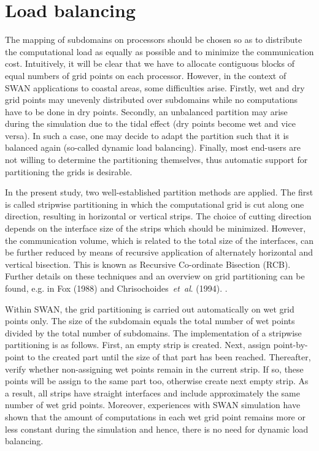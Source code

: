 \documentclass[12pt]{book}
\begin{document}
\section{Load balancing} \label{sec:loa}

The mapping of subdomains on processors should be chosen so as to distribute
the computational load as equally as possible and to minimize the communication
cost. Intuitively, it will be clear that we have to allocate contiguous blocks
of equal numbers of grid points on each processor. However, in the context of
SWAN applications to coastal areas, some difficulties arise. Firstly, wet and
dry grid points may unevenly distributed over subdomains while no computations
have to be done in dry points. Secondly, an unbalanced partition may arise
during the simulation due to the tidal effect (dry points become wet and vice
versa). In such a case, one may decide to adapt the partition such that it is
balanced again (so-called dynamic load balancing). Finally, most end-users are
not willing to determine the partitioning themselves, thus automatic support
for partitioning the grids is desirable.

In the present study, two well-established partition methods are applied. The
first is called stripwise partitioning in which the computational grid is cut
along one direction, resulting in horizontal or vertical strips. The choice of
cutting direction depends on the interface size of the strips which should be
minimized. However, the communication volume, which is related to the total size
of the interfaces, can be further reduced by means of recursive application of
alternately horizontal and vertical bisection. This is known as Recursive
Co-ordinate Bisection (RCB). Further details on these techniques and an overview
on grid partitioning can be found, e.g. in Fox (1988) and Chrisochoides~{\it et~al}. (1994).
\nocite{Fox88,Chr94HR}.

Within SWAN, the grid partitioning is carried out automatically on wet grid points
only. The size of the subdomain equals the total number of wet points divided by
the total number of subdomains. The implementation of a stripwise partitioning is
as follows. First, an empty strip is created. Next, assign point-by-point to the
created part until the size of that part has been reached. Thereafter, verify
whether non-assigning wet points remain in the current strip. If so, these points
will be assign to the same part too, otherwise create next empty strip. As a result,
all strips have straight interfaces and include approximately the same number of wet
grid points. Moreover, experiences with SWAN simulation have shown that the amount
of computations in each wet grid point remains more or less constant during the
simulation and hence, there is no need for dynamic load balancing.
\end{document}
